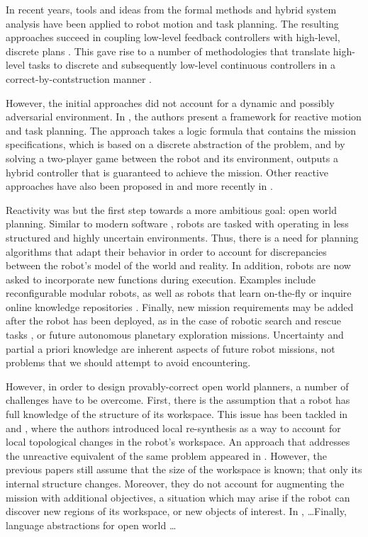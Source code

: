 In recent years, tools and ideas from the formal methods and hybrid system analysis have been applied to robot motion and task planning. The resulting approaches succeed in coupling low-level feedback controllers \cite{} with high-level, discrete plans \cite{}. This gave rise to a number of methodologies that translate high-level tasks to discrete and subsequently low-level continuous controllers in a correct-by-contstruction manner \cite{}.

However, the initial approaches did not account for a dynamic and possibly adversarial environment. In \cite{KGFP_TRO09}, the authors present a framework for reactive motion and task planning. The approach takes a logic formula that contains the mission specifications, which is based on a discrete abstraction of the problem, and by solving a two-player game between the robot and its environment, outputs a hybrid controller that is guaranteed to achieve the mission. Other reactive approaches have also been proposed in \cite{Wongpiromsarn2010} and more recently in \cite{Belta2013RSS}.

Reactivity was but the first step towards a more ambitious goal: open world planning. Similar to modern software \cite{open-world-se}, robots are tasked with operating in less structured and highly uncertain environments. Thus, there is a need for planning algorithms that adapt their behavior in order to account for discrepancies between the robot's model of the world and reality. In addition, robots are now asked to incorporate new functions during execution. Examples include reconfigurable modular robots, as well as robots that learn on-the-fly \cite{SaxenaIJRR2012} or inquire online knowledge repositories \cite{rapyuta2013}. Finally, new mission requirements may be added after the robot has been deployed, as in the case of robotic search and rescue tasks \cite{MatthiasAI2010}, or future autonomous planetary exploration missions. Uncertainty and partial a priori knowledge are inherent aspects of future robot missions, not problems that we should attempt to avoid encountering.

However, in order to design provably-correct open world planners, a number of challenges have to be overcome. First, there is the assumption that a robot has full knowledge of the structure of its workspace. This issue has been tackled in \cite{MurrayICRA2012} and \cite{MurrayICRA2013a}, where the authors introduced local re-synthesis as a way to account for local topological changes in the robot's workspace. An approach that addresses the unreactive equivalent of the same problem appeared in \cite{Dimos2013ICRA}. However, the previous papers still assume that the size of the workspace is known; that only its internal structure changes. Moreover, they do not account for augmenting the mission with additional objectives, a situation which may arise if the robot can discover new regions of its workspace, or new objects of interest. In \cite{BingxinRSS2012}, \ldots Finally, language abstractions for open world \ldots

